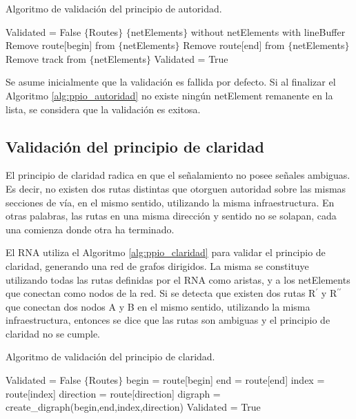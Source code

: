		\begin{algorithm}[hbt!]
			\caption{Algoritmo de validación del principio de autoridad.}\label{alg:ppio_autoridad}
			\DontPrintSemicolon
			\SetNoFillComment
			\LinesNotNumbered 
			Validated = False\;
			$\{$Routes$\}$\; 
			$\{$netElements$\}$ without netElements with lineBuffer\; 
			{
				{
					Remove route[begin] from $\{$netElements$\}$\; 
				}
				{
					Remove route[end] from $\{$netElements$\}$\; 
				}
				{
					{
						Remove track from $\{$netElements$\}$\; 
					} 
				}
			}
			{
				Validated = True\; 
			} 
		\end{algorithm}
		
		Se asume inicialmente que la validación es fallida por defecto. Si al finalizar el Algoritmo \ref{alg:ppio_autoridad} no existe ningún netElement remanente en la lista, se considera que la validación es exitosa.	
			
	\subsection{Validación del principio de claridad}
		
		El principio de claridad radica en que el señalamiento no posee señales ambiguas. Es decir, no existen dos rutas distintas que otorguen autoridad sobre las mismas secciones de vía, en el mismo sentido, utilizando la misma infraestructura. En otras palabras, las rutas en una misma dirección y sentido no se solapan, cada una comienza donde otra ha terminado.
		
		El RNA utiliza el Algoritmo \ref{alg:ppio_claridad} para validar el principio de claridad, generando una red de grafos dirigidos. La misma se constituye utilizando todas las rutas definidas por el RNA como aristas, y a los netElements que conectan como nodos de la red. Si se detecta que existen dos rutas R$^{\prime}$ y R$^{\prime\prime}$ que conectan dos nodos A y B en el mismo sentido, utilizando la misma infraestructura, entonces se dice que las rutas son ambiguas y el principio de claridad no se cumple.
		
		\begin{algorithm}[hbt!]
			\caption{Algoritmo de validación del principio de claridad.}\label{alg:ppio_claridad}
			\DontPrintSemicolon
			\SetNoFillComment
			\LinesNotNumbered 
			Validated = False\;
			$\{$Routes$\}$\; 
			{
				begin = route[begin]\;
				end = route[end]\;
				index = route[index] \;
				direction = route[direction]\;
				digraph = create\_digraph(begin,end,index,direction)\;	
			}
			{
				Validated = True\;
			}
		\end{algorithm}
		
